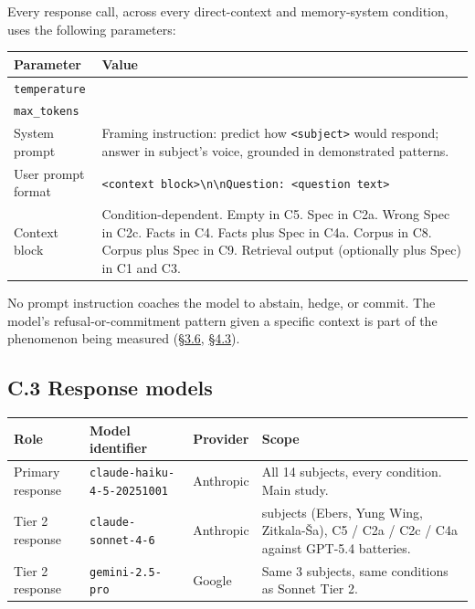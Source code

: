 Every response call, across every direct-context and memory-system
condition, uses the following parameters:

\begin{longtable}[]{@{}
  >{\raggedright\arraybackslash}p{}
  >{\raggedright\arraybackslash}p{}@{}}
\toprule
Parameter & Value \\
\midrule
\endhead
\texttt{temperature} & 0 \\
\texttt{max\_tokens} & 1024 \\
System prompt & Framing instruction: predict how
\texttt{\textless{}subject\textgreater{}} would respond; answer in
subject's voice, grounded in demonstrated patterns. \\
User prompt format &
\texttt{\textless{}context\ block\textgreater{}\textbackslash{}n\textbackslash{}nQuestion:\ \textless{}question\ text\textgreater{}} \\
Context block & Condition-dependent. Empty in C5. Spec in C2a. Wrong
Spec in C2c. Facts in C4. Facts plus Spec in C4a. Corpus in C8. Corpus
plus Spec in C9. Retrieval output (optionally plus Spec) in C1 and
C3. \\
\bottomrule
\end{longtable}

No prompt instruction coaches the model to abstain, hedge, or commit.
The model's refusal-or-commitment pattern given a specific context is
part of the phenomenon being measured (\hyperref[response-models]{§3.6}, \hyperref[mechanism-correct-content-not-format]{§4.3}).

\hypertarget{c.3-response-models}{%
\subsection{C.3 Response models}\label{c.3-response-models}}

\begin{longtable}[]{@{}
  >{\raggedright\arraybackslash}p{}
  >{\raggedright\arraybackslash}p{}
  >{\raggedright\arraybackslash}p{}
  >{\raggedright\arraybackslash}p{}@{}}
\toprule
Role & Model identifier & Provider & Scope \\
\midrule
\endhead
Primary response & \texttt{claude-haiku-4-5-20251001} & Anthropic & All
14 subjects, every condition. Main study. \\
Tier 2 response & \texttt{claude-sonnet-4-6} & Anthropic & 3 subjects
(Ebers, Yung Wing, Zitkala-Ša), C5 / C2a / C2c / C4a against GPT-5.4
batteries. \\
Tier 2 response & \texttt{gemini-2.5-pro} & Google & Same 3 subjects,
same conditions as Sonnet Tier 2. \\
\bottomrule
\end{longtable}

